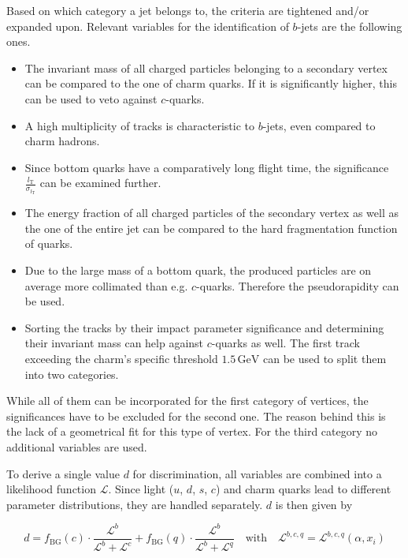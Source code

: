Based on which category a jet belongs to, the criteria are tightened and/or expanded upon. Relevant variables for the identification of $b$-jets are the following ones.

\begin{itemize}
\item The invariant mass of all charged particles belonging to a secondary vertex can be compared to the one of charm quarks. If it is significantly higher, this can be used to veto against $c$-quarks.
\item A high multiplicity of tracks is characteristic to $b$-jets, even compared to charm hadrons.
\item Since bottom quarks have a comparatively long flight time, the significance $\frac{l_{\text{T}}}{\sigma_{l_{\text{T}}}}$ can be examined further.
\item The energy fraction of all charged particles of the secondary vertex as well as the one of the entire jet can be compared to the hard fragmentation function of quarks.
\item Due to the large mass of a bottom quark, the produced particles are on average more collimated than e.g. $c$-quarks. Therefore the pseudorapidity can be used.
\item Sorting the tracks by their impact parameter significance and determining their invariant mass can help against $c$-quarks as well. The first track exceeding the charm's specific threshold $1.5\,\text{GeV}$ can be used to split them into two categories.
\end{itemize}

\noindent While all of them can be incorporated for the first category of vertices, the significances have to be excluded for the second one. The reason behind this is the lack of a geometrical fit for this type of vertex. For the third category no additional variables are used.

To derive a single value $d$ for discrimination, all variables are combined into a likelihood function $\mathcal{L}$. Since light ($u$, $d$, $s$, $c$) and charm quarks lead to different parameter distributions, they are handled separately. $d$ is then given by

\begin{equation}
  \label{eq:btagdiscriminator}
  d = f_{\text{BG}}(c) \cdot \frac{\mathcal{L}^b}{\mathcal{L}^b + \mathcal{L}^c} + f_{\text{BG}}(q) \cdot \frac{\mathcal{L}^b}{\mathcal{L}^b + \mathcal{L}^q} \quad \text{with} \quad \mathcal{L}^{b, c, q} = \mathcal{L}^{b, c, q} (\alpha, x_i)
\end{equation}

